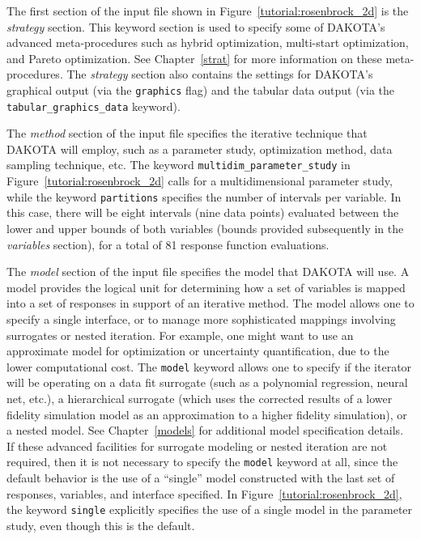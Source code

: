 The first section of the input file shown in
Figure~\ref{tutorial:rosenbrock_2d} is the \emph{strategy} section.
This keyword section is used to specify some of DAKOTA's advanced
meta-procedures such as hybrid optimization, 
multi-start optimization, and Pareto optimization.
See Chapter~\ref{strat} for more information on these
meta-procedures. The \emph{strategy} section also contains the
settings for DAKOTA's graphical output (via the \texttt{graphics}
flag) and the tabular data output (via the
\texttt{tabular\_graphics\_data} keyword).

The \emph{method} section of the input file specifies the iterative
technique that DAKOTA will employ, such as a parameter study,
optimization method, data sampling technique, etc.
The keyword \texttt{multidim\_parameter\_study}
in Figure~\ref{tutorial:rosenbrock_2d} calls for a multidimensional
parameter study, while the keyword \texttt{partitions} specifies the
number of intervals per variable. In this case, there will be eight
intervals (nine data points) evaluated between the lower and upper
bounds of both variables (bounds provided subsequently in the
\emph{variables} section), for a total of 81 response function
evaluations.

The \emph{model} section of the input file specifies the model that
DAKOTA will use.  A model provides the logical unit for determining
how a set of variables is mapped into a set of responses in support of
an iterative method.  The model allows one to specify a single
interface, or to manage more sophisticated mappings involving
surrogates or nested iteration.  For example, one might want to use
an approximate model for optimization or uncertainty quantification,
due to the lower computational cost.  The
\texttt{model} keyword allows one to specify if the iterator will be
operating on a data fit surrogate (such as a polynomial regression,
neural net, etc.), a hierarchical surrogate (which uses the corrected
results of a lower fidelity simulation model as an approximation to a
higher fidelity simulation), or a nested model. See
Chapter~\ref{models} for additional model specification details. If
these advanced facilities for surrogate modeling or nested iteration
are not required, then it is not necessary to specify the
\texttt{model} keyword at all, since the default behavior is the use
of a ``single'' model constructed with the last set of responses,
variables, and interface specified.  In
Figure~\ref{tutorial:rosenbrock_2d}, the keyword \texttt{single}
explicitly specifies the use of a single model in the parameter study,
even though this is the default.

